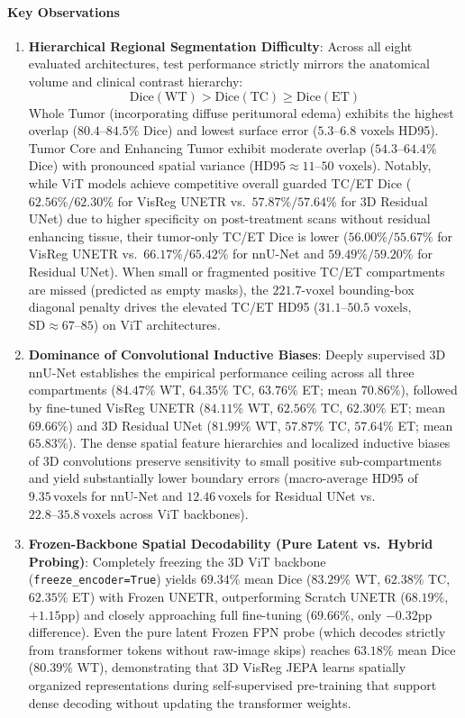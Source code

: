 \documentclass{article}
\begin{document}
\paragraph{Key Observations}
\begin{enumerate}
    \item \textbf{Hierarchical Regional Segmentation Difficulty}: Across all eight evaluated architectures, test performance strictly mirrors the anatomical volume and clinical contrast hierarchy:
    \begin{equation}
        \text{Dice}(\text{WT}) > \text{Dice}(\text{TC}) \ge \text{Dice}(\text{ET})
    \end{equation}
    Whole Tumor (incorporating diffuse peritumoral edema) exhibits the highest overlap ($80.4\text{--}84.5\%$ Dice) and lowest surface error ($5.3\text{--}6.8\text{ voxels}$ HD95). Tumor Core and Enhancing Tumor exhibit moderate overlap ($54.3\text{--}64.4\%$ Dice) with pronounced spatial variance ($\text{HD95} \approx 11\text{--}50\text{ voxels}$). Notably, while ViT models achieve competitive overall guarded TC/ET Dice ($62.56\% / 62.30\%$ for VisReg UNETR vs.\ $57.87\% / 57.64\%$ for 3D Residual UNet) due to higher specificity on post-treatment scans without residual enhancing tissue, their tumor-only TC/ET Dice is lower ($56.00\% / 55.67\%$ for VisReg UNETR vs.\ $66.17\% / 65.42\%$ for nnU-Net and $59.49\% / 59.20\%$ for Residual UNet). When small or fragmented positive TC/ET compartments are missed (predicted as empty masks), the $221.7\text{-voxel}$ bounding-box diagonal penalty drives the elevated TC/ET HD95 ($31.1\text{--}50.5\text{ voxels}$, $\text{SD} \approx 67\text{--}85$) on ViT architectures.
    \item \textbf{Dominance of Convolutional Inductive Biases}: Deeply supervised 3D nnU-Net establishes the empirical performance ceiling across all three compartments ($84.47\%$ WT, $64.35\%$ TC, $63.76\%$ ET; mean $70.86\%$), followed by fine-tuned VisReg UNETR ($84.11\%$ WT, $62.56\%$ TC, $62.30\%$ ET; mean $69.66\%$) and 3D Residual UNet ($81.99\%$ WT, $57.87\%$ TC, $57.64\%$ ET; mean $65.83\%$). The dense spatial feature hierarchies and localized inductive biases of 3D convolutions preserve sensitivity to small positive sub-compartments and yield substantially lower boundary errors (macro-average HD95 of $9.35\,\text{voxels}$ for nnU-Net and $12.46\,\text{voxels}$ for Residual UNet vs.\ $22.8\text{--}35.8\,\text{voxels}$ across ViT backbones).
    \item \textbf{Frozen-Backbone Spatial Decodability (Pure Latent vs.\ Hybrid Probing)}: Completely freezing the 3D ViT backbone (\texttt{freeze\_encoder=True}) yields $69.34\%$ mean Dice ($83.29\%$ WT, $62.38\%$ TC, $62.35\%$ ET) with Frozen UNETR, outperforming Scratch UNETR ($68.19\%$, $+1.15\text{pp}$) and closely approaching full fine-tuning ($69.66\%$, only $-0.32\text{pp}$ difference). Even the pure latent Frozen FPN probe (which decodes strictly from transformer tokens without raw-image skips) reaches $63.18\%$ mean Dice ($80.39\%$ WT), demonstrating that 3D VisReg JEPA learns spatially organized representations during self-supervised pre-training that support dense decoding without updating the transformer weights.

\end{enumerate}
\end{document}
